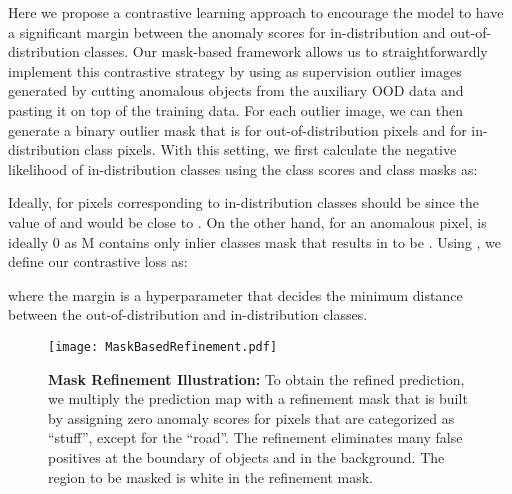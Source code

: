 \documentclass[10pt,twocolumn,letterpaper]{article}
\begin{document}
Here we propose a contrastive learning approach to encourage the model to have a significant margin between the anomaly scores for in-distribution and out-of-distribution classes. 
Our mask-based framework allows us to straightforwardly implement this contrastive strategy by using as supervision 
outlier images generated by cutting anomalous objects from the auxiliary OOD data and pasting it on top of the training data. For each outlier image, we can then generate a binary outlier mask  that is  for out-of-distribution pixels and  for in-distribution class pixels. With this setting, we first calculate the negative likelihood of in-distribution classes using the class scores  and class masks  as:

Ideally,  for pixels corresponding to in-distribution classes  should be  since the value of  and  would be close to . On the other hand, for an anomalous pixel,  is ideally 0 as M contains only inlier classes mask that results in  to be . Using , we define our contrastive loss as:

where the margin  is a hyperparameter that decides the minimum distance between the out-of-distribution and in-distribution classes.
\begin{figure}[t]
    \begin{center}
        \texttt{[image: MaskBasedRefinement.pdf]}
    \end{center}
    \vspace{-1em}
    \caption{\textbf{Mask Refinement Illustration:} To obtain the refined prediction, we multiply the prediction map with a refinement mask that is built by assigning zero anomaly scores for pixels that are categorized as ``stuff'', except for the ``road''. The refinement eliminates many false positives at the boundary of objects and in the background. The region to be masked is white in the refinement mask.}
    \vspace{-1em}
    \label{fig:refinements}
\end{figure}
\end{document}
